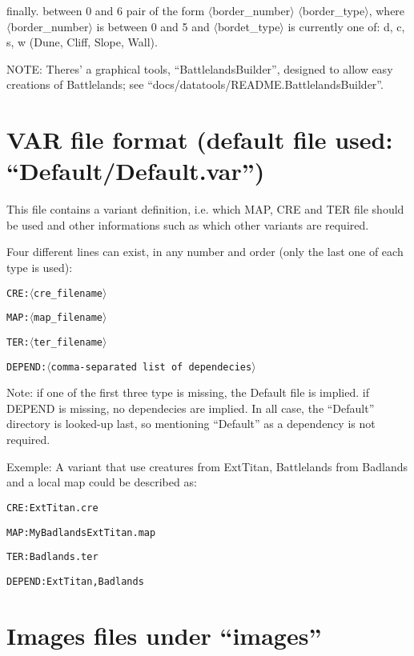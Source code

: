 \documentclass{article}
\begin{document}
finally. between 0 and 6 pair of the form $\langle$border\_number$\rangle$ $\langle$border\_type$\rangle$, where $\langle$border\_number$\rangle$ is between 0 and 5 and $\langle$bordet\_type$\rangle$ is currently one of: d, c, s, w (Dune, Cliff, Slope, Wall).

NOTE: Theres' a graphical tools, ``BattlelandsBuilder'', designed to allow easy creations of Battlelands; see ``docs/datatools/README.BattlelandsBuilder''.

\section{VAR file format (default file used: ``Default/Default.var'')}

This file contains a variant definition, i.e. which
MAP, CRE and TER file should be used and other informations
such as which other variants are required.

Four different lines can exist, in any number and order
(only the last one of each type is used):

\texttt{CRE:$\langle$cre\_filename$\rangle$}

\texttt{MAP:$\langle$map\_filename$\rangle$}

\texttt{TER:$\langle$ter\_filename$\rangle$}

\texttt{DEPEND:$\langle$comma-separated list of dependecies$\rangle$}

Note: if one of the  first three type is missing, the Default
file is implied. if DEPEND is missing, no dependecies are implied.
In all case, the ``Default'' directory is looked-up last, so
mentioning ``Default'' as a dependency is not required.

Exemple: A variant that use creatures from ExtTitan, Battlelands from Badlands and a local map could be described as:

\texttt{CRE:ExtTitan.cre}

\texttt{MAP:MyBadlandsExtTitan.map}

\texttt{TER:Badlands.ter}

\texttt{DEPEND:ExtTitan,Badlands}

\section{Images files under ``images''}
\label{images}
\end{document}
